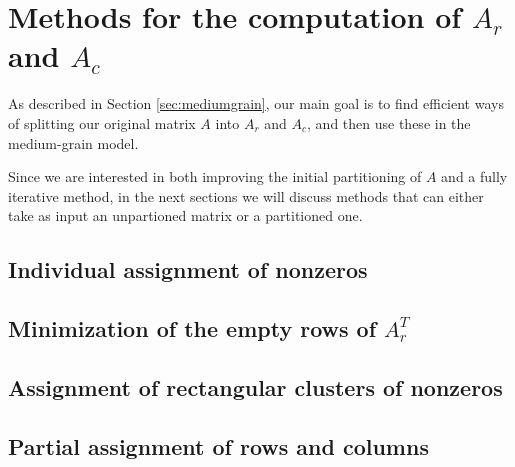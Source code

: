 \chapter{Methods for the computation of $A_r$ and $A_c$} \label{chap:methods}

As described in Section \ref{sec:mediumgrain}, our main goal is to find efficient ways of splitting our original matrix $A$ into $A_r$ and $A_c$, and then use these in the medium-grain model.

Since we are interested in both improving the initial partitioning of $A$ and a fully iterative method, in the next sections we will discuss methods that can either take as input an unpartioned matrix or a partitioned one.

\section{Individual assignment of nonzeros} \label{sec:localview}

\section{Minimization of the empty rows of $A_r^T$} \label{sec:globalview}
\section{Assignment of rectangular clusters of nonzeros} \label{sec:sbd}
\section{Partial assignment of rows and columns} \label{sec:hot_restart}
